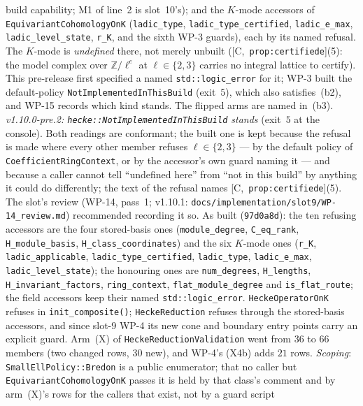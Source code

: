 \documentclass[11pt]{article}
\theoremstyle{remark}
\newcommand{\Z}{\mathbb{Z}}
\newcommand{\HA}[1]{[C,~\texttt{#1}]}      %
\begin{document}
\begin{enumerate}[label=(b\arabic*)]
\begin{itemize}
    build capability; M1 of line~2 is slot~10's); and the $K$-mode accessors of
    \texttt{EquivariantCohomologyOnK} (\texttt{ladic\_type}, \texttt{ladic\_type\_certified},
    \texttt{ladic\_e\_max}, \texttt{ladic\_level\_state}, \texttt{r\_K}, and the sixth WP-3
    guards), each by its named refusal. The $K$-mode is \emph{undefined} there, not merely unbuilt
    (\HA{prop:certifiede}(5): the model complex over $\Z/\ell^e$ at $\ell\in\{2,3\}$ carries no
    integral lattice to certify). This pre-release first specified a named \texttt{std::logic\_error}
    for it; WP-3 built the default-policy \texttt{NotImplementedInThisBuild} (exit~$5$), which also
    satisfies~(b2), and WP-15 records which kind stands. The flipped arms are named in~(b3).
    \emph{v1.10.0-pre.2: \texttt{hecke::NotImplementedInThisBuild} stands} (exit~$5$ at the
    console). Both readings are conformant; the built one is kept because the refusal is made
    where every other member refuses $\ell\in\{2,3\}$ --- by the default policy of
    \texttt{CoefficientRingContext}, or by the accessor's own guard naming it --- and because a
    caller cannot tell ``undefined here'' from ``not in this build'' by anything it could do
    differently; the text of the refusal names \HA{prop:certifiede}(5). The slot's review
    (WP-14, pass~1; v1.10.1: \texttt{docs/implementation/slot9/WP-14\_review.md}) recommended recording it so. As built (\texttt{97d0a8d}): the ten refusing
    accessors are the four stored-basis ones (\texttt{module\_degree}, \texttt{C\_eq\_rank},
    \texttt{H\_module\_basis}, \texttt{H\_class\_coordinates}) and the six $K$-mode ones
    (\texttt{r\_K}, \texttt{ladic\_applicable}, \texttt{ladic\_type\_certified},
    \texttt{ladic\_type}, \texttt{ladic\_e\_max}, \texttt{ladic\_level\_state}); the honouring ones
    are \texttt{num\_degrees}, \texttt{H\_lengths}, \texttt{H\_invariant\_factors},
    \texttt{ring\_context}, \texttt{flat\_module\_degree} and \texttt{is\_flat\_route}; the field
    accessors keep their named \texttt{std::logic\_error}. \texttt{HeckeOperatorOnK} refuses in
    \texttt{init\_composite()}; \texttt{HeckeReduction} refuses through the stored-basis accessors,
    and since slot-9 WP-4 its new cone and boundary entry points carry an explicit guard. Arm~(X)
    of \texttt{HeckeReductionValidation} went from $36$ to $66$ members (two changed rows, $30$
    new), and WP-4's (X4b) adds $21$ rows. \emph{Scoping}: \texttt{SmallEllPolicy::Bredon} is a
    public enumerator; that no caller but \texttt{EquivariantCohomologyOnK} passes it is held by
    that class's comment and by arm~(X)'s rows for the callers that exist, not by a guard script

\end{itemize}
\end{enumerate}
\end{document}
